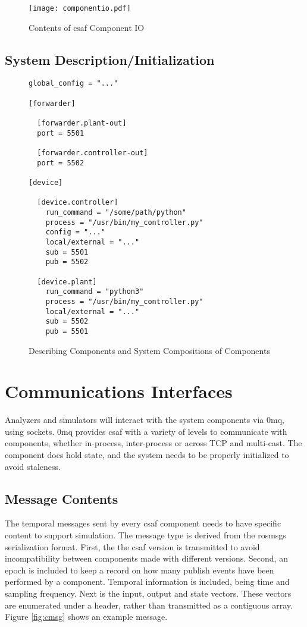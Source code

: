 \begin{figure}
\centering
\texttt{[image: componentio.pdf]}
\caption{Contents of \acrshort{csaf}  Component IO}
\label{fig:cio}
\end{figure}

\subsection{System Description/Initialization}

\begin{figure}
\begin{lstlisting}
global_config = "..."

[forwarder]

  [forwarder.plant-out]
  port = 5501

  [forwarder.controller-out]
  port = 5502

[device]

  [device.controller]
    run_command = "/some/path/python"
    process = "/usr/bin/my_controller.py"
    config = "..."
    local/external = "..."
    sub = 5501
    pub = 5502

  [device.plant]
    run_command = "python3"
    process = "/usr/bin/my_controller.py"
    local/external = "..."
    sub = 5502
    pub = 5501
\end{lstlisting}
\caption{Describing Components and System Compositions of Components}
\label{fig:sysset}
\end{figure}

\section{Communications Interfaces}

Analyzers and simulators will interact with the system components via \acrshort{0mq}, using sockets. \acrshort{0mq} 
provides \acrshort{csaf}  with a variety of levels to communicate with components, whether in-process, 
inter-process or across TCP and multi-cast. The component does hold state, and the system needs to be 
properly initialized to avoid staleness.

\subsection{Message Contents}

The temporal messages sent by every \acrshort{csaf}  component needs to have specific content to support 
simulation. The message type is derived from the \acrshort{ros}msgs serialization format. First, the the 
\acrshort{csaf}  version is transmitted to avoid incompatibility between components made with different 
versions. Second, an epoch is included to keep a record on how many publish events have been performed 
by a component. Temporal information is included, being time and sampling frequency. Next is the input, 
output and state vectors. These vectors are enumerated under a header, rather than transmitted as a 
contiguous array. Figure \ref{fig:cmsg} shows an example message. \\

